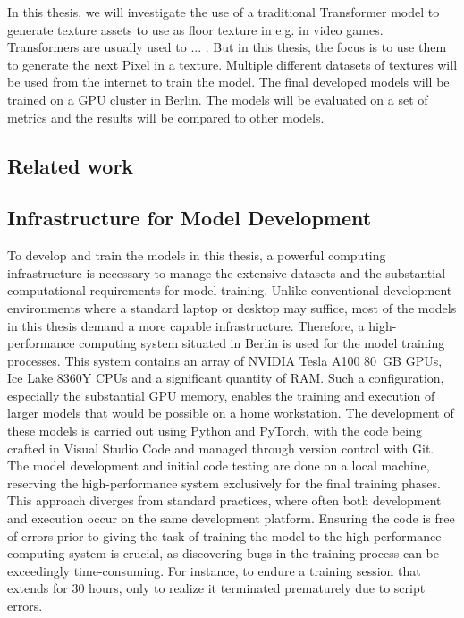 
In this thesis, we will investigate the use of a traditional Transformer model to generate texture assets to use as floor texture in e.g. in video games. Transformers are usually used to ... . But in this thesis, the focus is to use them to generate the next Pixel in a texture. Multiple different datasets of textures will be used from the internet to train the model. The final developed models will be trained on a GPU cluster in Berlin. The models will be evaluated on a set of metrics and the results will be compared to other models.

\subsection{Related work}
    

\subsection{Infrastructure for Model Development}

To develop and train the models in this thesis, a powerful computing infrastructure is necessary to manage the extensive datasets and the substantial computational requirements for model training. Unlike conventional development environments where a standard laptop or desktop may suffice, most of the models in this thesis demand a more capable infrastructure. Therefore, a high-performance computing system situated in Berlin is used for the model training processes. This system contains an array of NVIDIA Tesla A100 80 GB GPUs, Ice Lake 8360Y CPUs and a significant quantity of RAM. Such a configuration, especially the substantial GPU memory, enables the training and execution of larger models that would be possible on a home workstation. The development of these models is carried out using Python and PyTorch, with the code being crafted in Visual Studio Code and managed through version control with Git. The model development and initial code testing are done on a local machine, reserving the high-performance system exclusively for the final training phases. This approach diverges from standard practices, where often both development and execution occur on the same development platform. Ensuring the code is free of errors prior to giving the task of training the model to the high-performance computing system is crucial, as discovering bugs in the training process can be exceedingly time-consuming. For instance, to endure a training session that extends for 30 hours, only to realize it terminated prematurely due to script errors.

